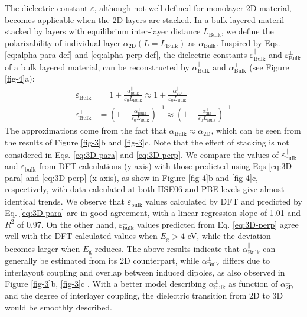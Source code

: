 \documentclass[journal=ancac3,manuscript=article,email=true,hyperref=true,keywords=false]{achemso}
\begin{document}
The dielectric constant $\varepsilon$, although not well-defined for
monolayer 2D material, becomes applicable when the 2D layers are
stacked. 
In a bulk layered materil stacked by layers with equilibrium
inter-layer distance $L_{\mathrm{Bulk}}$, we define the polarizability
of individual layer $\alpha_{\mathrm{2D}}(L=L_{\mathrm{Bulk}})$ as
$\alpha_{\mathrm{Bulk}}$. Inspired by Eqs. \ref{eq:alpha-para-def} and
\ref{eq:alpha-perp-def}, the dielectric constants
$\varepsilon^{\parallel}_{\mathrm{Bulk}}$ and
$\varepsilon^{\perp}_{\mathrm{Bulk}}$ of a bulk layered material, can
be reconstructed by $\alpha_{\mathrm{Bulk}}^{\parallel}$ and
$\alpha_{\mathrm{Bulk}}^{\perp}$ (see Figure \ref{fig-4}a):
\begin{subequations}
\begin{align}
  \label{eq:3D-para}
  \varepsilon^{\parallel}_{\mathrm{Bulk}}
  &= 1 + \frac{\alpha_{\mathrm{bulk}}^{\parallel}}{\varepsilon_{0} L_{\mathrm{Bulk}}}
  \approx 1 + \frac{\alpha_{\mathrm{2D}}^{\parallel}}{\varepsilon_{0} L_{\mathrm{Bulk}}} \\
  \label{eq:3D-perp}
  \varepsilon^{\perp}_{\mathrm{Bulk}}
  &= \left(1 - \frac{\alpha_{\mathrm{Bulk}}^{\perp}}{\varepsilon_{0} L_{\mathrm{Bulk}}}\right)^{-1}
  \approx \left(1 - \frac{\alpha_{\mathrm{2D}}^{\perp}}{\varepsilon_{0} L_{\mathrm{Bulk}}}\right)^{-1}
\end{align}
\end{subequations}
The approximations come from the fact that
$\alpha_{\mathrm{Bulk}} \approx \alpha_{\mathrm{2D}}$, which can be
seen from the results of Figure \ref{fig-3}b and \ref{fig-3}c.  Note
that the effect of stacking is not considered in Eqs. \ref{eq:3D-para}
and \ref{eq:3D-perp}. We compare the values of
$\varepsilon_{\mathrm{bulk}}^{\parallel}$ and
$\varepsilon_{\mathrm{bulk}}^{\perp}$ from DFT calculations (y-axis)
with those predicted using Eqs \ref{eq:3D-para} and \ref{eq:3D-perp}
(x-axis), as show in Figure \ref{fig-4}b and \ref{fig-4}c,
respectively, with data calculated at both HSE06 and PBE levels give
almost identical trends. We observe that
$\varepsilon_{\mathrm{bulk}}^{\parallel}$ values calculated by DFT and
predicted by Eq. \ref{eq:3D-para} are in good agreement, with a linear
regression slope of 1.01 and $R^2$ of 0.97. On the other hand,
$\varepsilon_{\mathrm{bulk}}^{\perp}$ values predicted from
Eq. \ref{eq:3D-perp} agree well with the DFT-calculated values when
$E_{\mathrm{g}}>4$ eV, while the deviation becomes larger when
$E_{\mathrm{g}}$ reduces. The above results indicate that
$\alpha^{\parallel}_{\mathrm{Bulk}}$ can generally be estimated from
its 2D counterpart, while $\alpha^{\perp}_{\mathrm{Bulk}}$ differs due
to interlayout coupling and overlap between induced
dipoles\cite{Andersen_2015_dielec_vdWH,Laturia_2018}, as also observed
in Figure \ref{fig-3}b, \ref{fig-3}c . With a better model describing
$\alpha_{\mathrm{bulk}}^{\perp}$ as function of $\alpha_{\mathrm{2D}}^{\perp}$ and
the degree of interlayer coupling, the dielectric transition from 2D
to 3D would be smoothly described.
\end{document}
